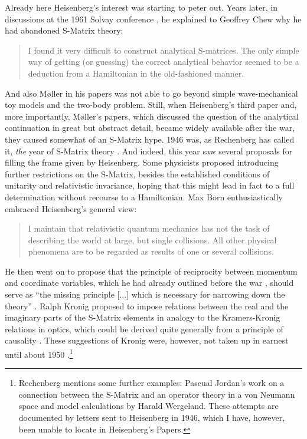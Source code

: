 \documentclass[12pt,a4paper]{article}
\begin{document}
Already here Heisenberg's interest was starting to peter out. Years later, in discussions at the 1961 Solvay conference \citep[p.174]{solvay_1961_la-theorie}, he explained to Geoffrey Chew why he had abandoned S-Matrix theory:

\begin{quote}
I found it very difficult to construct analytical S-matrices. The only simple way of getting (or guessing) the correct analytical behavior seemed to be a deduction from a Hamiltonian in the old-fashioned manner.
\end{quote}

And also M\o ller in his papers was not able to go beyond simple wave-mechanical toy models and the two-body problem. Still, when Heisenberg's third paper and, more importantly, M\o ller's papers, which discussed the question of the analytical continuation in great but abstract detail, became widely available after the war, they caused somewhat of an S-Matrix hype. 1946 was, as Rechenberg has called it, \emph{the} year of S-Matrix theory \citep[p. 564]{rechenberg_1989_the-early}. And indeed, this year saw several proposals for filling the frame given by Heisenberg. Some physicists proposed introducing further restrictions on the S-Matrix, besides the established conditions of unitarity and relativistic invariance, hoping that this might lead in fact to a full determination without recourse to a Hamiltonian. Max Born enthusiastically embraced Heisenberg's general view:

\begin{quote}
I maintain that relativistic quantum mechanics has not the task of describing the world at large, but single collisions. All other physical phenomena are to be regarded as results of one or several collisions. \citep[p. 15]{born_1947_relativistic}
\end{quote}

He then went on to propose that the principle of reciprocity between momentum and coordinate variables, which he had already outlined before the war \citep{born_1938_a-suggestion}, should serve as ``the missing principle [...] which is necessary for narrowing down the theory'' \citep[p. 17]{born_1947_relativistic}. Ralph Kronig proposed to impose relations between the real and the imaginary parts of the S-Matrix elements in analogy to the Kramers-Kronig relations in optics, which could be derived quite generally from a principle of causality \citep{kronig_1946_a-supplementary}. These suggestions of Kronig were, however, not taken up in earnest until about 1950 \citep[p. 57ff]{cushing_1990_theory}.\footnote{Rechenberg mentions some further examples: Pascual Jordan's work on a connection between the S-Matrix and an operator theory in a von Neumann space and model calculations by Harald Wergeland. These attempts are documented by letters sent to Heisenberg in 1946, which I have, however, been unable to locate in Heisenberg's Papers.}
\end{document}
